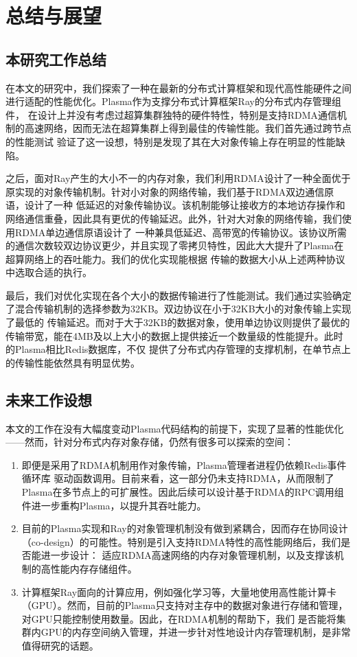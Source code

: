 \chapter{总结与展望}

\section{本研究工作总结}

在本文的研究中，我们探索了一种在最新的分布式计算框架和现代高性能硬件之间进行适配的性能优化。Plasma作为支撑分布式计算框架Ray的分布式内存管理组件，
在设计上并没有考虑过超算集群独特的硬件特性，特别是支持RDMA通信机制的高速网络，因而无法在超算集群上得到最佳的传输性能。我们首先通过跨节点的性能测试
验证了这一设想，特别是发现了其在大对象传输上存在明显的性能缺陷。

之后，面对Ray产生的大小不一的内存对象，我们利用RDMA设计了一种全面优于原实现的对象传输机制。针对小对象的网络传输，我们基于RDMA双边通信原语，设计了一种
低延迟的对象传输协议。该机制能够让接收方的本地访存操作和网络通信重叠，因此具有更优的传输延迟。此外，针对大对象的网络传输，我们使用RDMA单边通信原语设计了
一种兼具低延迟、高带宽的传输协议。该协议所需的通信次数较双边协议更少，并且实现了零拷贝特性，因此大大提升了Plasma在超算网络上的吞吐能力。我们的优化实现能根据
传输的数据大小从上述两种协议中选取合适的执行。

最后，我们对优化实现在各个大小的数据传输进行了性能测试。我们通过实验确定了混合传输机制的选择参数为32KB。双边协议在小于32KB大小的对象传输上实现了最低的
传输延迟。而对于大于32KB的数据对象，使用单边协议则提供了最优的传输带宽，能在4MB及以上大小的数据上提供接近一个数量级的性能提升。此时的Plasma相比Redis数据库，不仅
提供了分布式内存管理的支撑机制，在单节点上的传输性能依然具有明显优势。

\section{未来工作设想}

本文的工作在没有大幅度变动Plasma代码结构的前提下，实现了显著的性能优化——然而，针对分布式内存对象存储，仍然有很多可以探索的空间：

\begin{enumerate}
	\item 即便是采用了RDMA机制用作对象传输，Plasma管理者进程仍依赖Redis事件循环库\cite{ae}
	驱动函数调用。目前来看，这一部分仍未支持RDMA，从而限制了Plasma在多节点上的可扩展性。因此后续可以设计基于RDMA的RPC调用组件进一步重构Plasma，以提升其吞吐能力。
	\item 目前的Plasma实现和Ray的对象管理机制\cite{wang2021ownership}没有做到紧耦合，因而存在协同设计（co-design）的可能性。特别是引入支持RDMA特性的高性能网络后，我们是否能进一步设计：
	适应RDMA高速网络的内存对象管理机制，以及支撑该机制的高性能内存存储组件。
	\item 计算框架Ray面向的计算应用，例如强化学习等，大量地使用高性能计算卡（GPU）。然而，目前的Plasma只支持对主存中的数据对象进行存储和管理，对GPU只能控制使用数量。因此，在RDMA机制的帮助下，我们
	是否能将集群内GPU的内存空间纳入管理，并进一步针对性地设计内存管理机制，是非常值得研究的话题。
\end{enumerate}